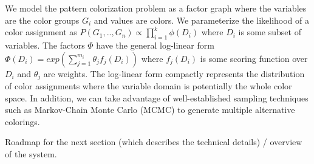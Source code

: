 We model the pattern colorization problem as a factor graph where the variables are the color groups $G_i$ and values are colors. We parameterize the likelihood of a color assignment as $P(G_1,..,G_n) \propto \prod_{i=1}^{k} \phi(D_i)$ where $D_i$ is some subset of variables. The factors $\Phi$ have the general log-linear form $\Phi(D_i) = exp(\sum_{j=1}^{m_i} \theta_j f_j(D_i))$ where $f_j(D_i)$ is some scoring function over $D_i$ and $\theta_j$ are weights. The log-linear form compactly represents the distribution of color assignments where the variable domain is potentially the whole color space. In addition, we can take advantage of well-established sampling techniques such as Markov-Chain Monte Carlo (MCMC) to generate multiple alternative colorings.



Roadmap for the next section (which describes the technical details) / overview of the system.